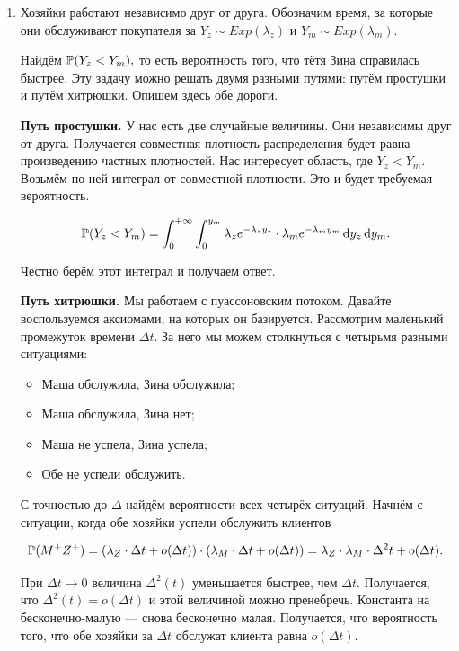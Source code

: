 \documentclass[12pt, a4paper, oneside]{article}
\begin{document}
\begin{sol}
\begin{enumerate} 
\item Хозяйки работают независимо друг от друга. Обозначим время, за которые они обслуживают покупателя за $Y_z \sim Exp(\lambda_z)$ и $Y_m \sim Exp(\lambda_m)$.

Найдём $\mathbb{P}(Y_z < Y_m),$ то есть вероятность того, что тётя Зина справилась быстрее. Эту задачу можно решать двумя разными путями: путём простушки и путём хитрюшки. Опишем здесь обе дороги. 

\textbf{Путь простушки.} У нас есть две случайные величины. Они независимы друг от друга. Получается совместная плотность распределения будет равна произведению частных плотностей. Нас интересует область, где  $Y_z < Y_m.$ Возьмём по ней интеграл от совместной плотности. Это и будет требуемая вероятность. 

\[
\mathbb{P}(Y_z < Y_m) = \int_{0}^{+\infty}  \int_{0}^{y_m} \lambda_z e^{-\lambda_z y_z} \cdot \lambda_m e^{-\lambda_m y_m} \,\mathrm{d}y_z \,\mathrm{d}y_m.
\]

Честно берём этот интеграл и получаем ответ.

\textbf{Путь хитрюшки.} Мы работаем с пуассоновским потоком. Давайте воспользуемся аксиомами, на которых он базируется. Рассмотрим маленький промежуток времени $\Delta t$. За него мы можем столкнуться с четырьмя разными ситуациями: 

\begin{itemize} 
\item Маша обслужила, Зина обслужила;
\item Маша обслужила, Зина нет;
\item Маша не успела, Зина успела;
\item Обе не успели обслужить.
\end{itemize} 

С точностью до $\Delta$ найдём вероятности всех четырёх ситуаций. Начнём с ситуации, когда обе хозяйки успели обслужить клиентов

\[
\mathbb{P}(M^{+}Z^{+}) = (\lambda_Z \cdot \Delta t + o(\Delta t))\cdot(\lambda_M \cdot \Delta t + o(\Delta t)) =  \lambda_Z \cdot \lambda_M \cdot \Delta^2 t + o(\Delta t).
\]

При $\Delta t \to 0$ величина $\Delta^2(t)$ уменьшается быстрее, чем $\Delta t$. Получается, что $\Delta^2(t) = o(\Delta t)$ и этой величиной можно пренебречь. Константа на бесконечно-малую --- снова бесконечно малая. Получается, что вероятность того, что обе хозяйки за $\Delta t$ обслужат клиента равна $o(\Delta t)$.


\end{enumerate}
\end{sol}
\end{document}
